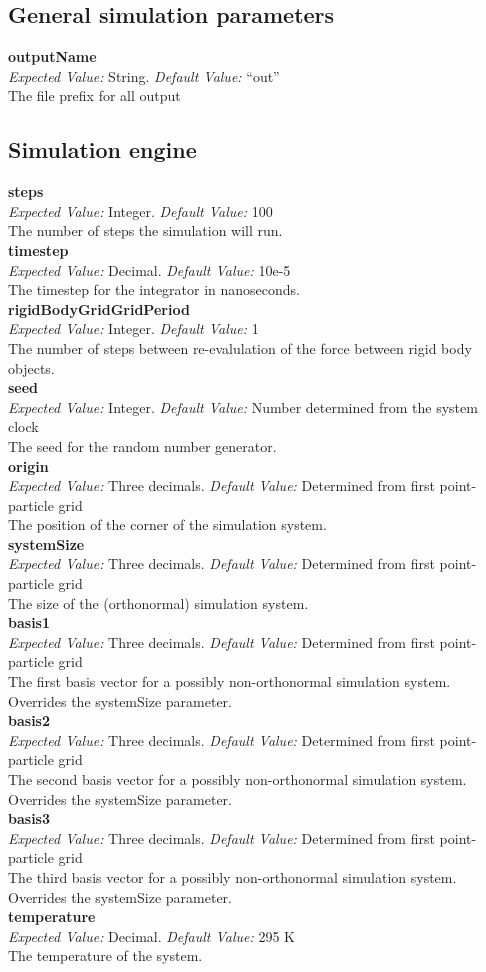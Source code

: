 \documentclass[10pt]{article}
\begin{document}
\newcommand{\keyword}[4]{\noindent\textbf{#1}\\\textit{Expected Value:} #2.  \textit{Default Value:} #3\\#4\\}

\subsection{General simulation parameters}

\keyword{outputName}{String}{``out''}
{The file prefix for all output}

\subsection{Simulation engine}


\keyword{steps}{Integer}{100}
{The number of steps the simulation will run.}

\keyword{timestep}{Decimal}{10e-5}
{The timestep for the integrator in nanoseconds.}

\keyword{rigidBodyGridGridPeriod}{Integer}{1}
{The number of steps between re-evalulation of the force between rigid body objects.}

\keyword{seed}{Integer}{Number determined from the system clock}
{The seed for the random number generator.}

\keyword{origin}{Three decimals}{Determined from first point-particle grid}
{The position of the corner of the simulation system.}

\keyword{systemSize}{Three decimals}{Determined from first point-particle grid}
{The size of the (orthonormal) simulation system.}

\keyword{basis1}{Three decimals}{Determined from first point-particle grid}
{The first basis vector for a possibly non-orthonormal simulation system. Overrides the systemSize parameter.}

\keyword{basis2}{Three decimals}{Determined from first point-particle grid}
{The second basis vector for a possibly non-orthonormal simulation system. Overrides the systemSize parameter.}

\keyword{basis3}{Three decimals}{Determined from first point-particle grid}
{The third basis vector for a possibly non-orthonormal simulation system. Overrides the systemSize parameter.}

\keyword{temperature}{Decimal}{295 K}
{The temperature of the system.}
\end{document}
